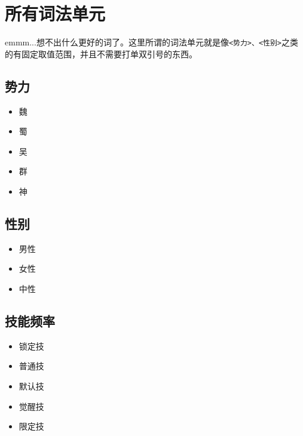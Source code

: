 \chapter{所有词法单元}

emmm...想不出什么更好的词了。这里所谓的词法单元就是像\verb|<势力>、<性别>|之类的有固定取值范围，并且不需要打单双引号的东西。

\section{势力}

\begin{itemize}
 \item 魏
 \item 蜀
 \item 吴
 \item 群
 \item 神
\end{itemize}

\section{性别}

\begin{itemize}
 \item 男性
 \item 女性
 \item 中性
\end{itemize}

\section{技能频率}

\begin{itemize}
 \item 锁定技
 \item 普通技
 \item 默认技
 \item 觉醒技
 \item 限定技
\end{itemize}



